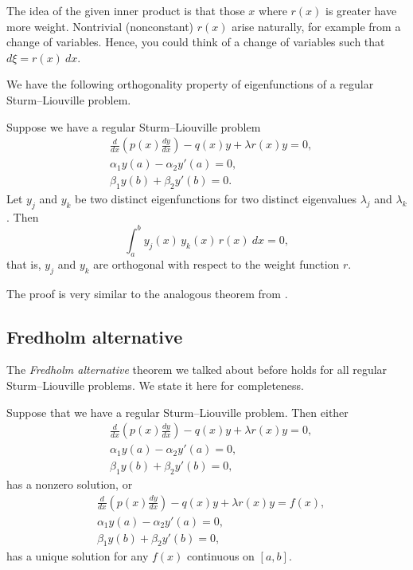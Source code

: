 The idea of the given inner product is that those $x$ where $r(x)$
is greater have more weight.
Nontrivial (nonconstant)
$r(x)$ arise naturally, for example from a change of variables.
Hence, you could
think of a change of variables such that $d\xi = r(x)~ dx$.

We have the following orthogonality property of eigenfunctions of a
regular Sturm--Liouville problem.

\begin{theorem}
Suppose we have a regular Sturm--Liouville problem
\begin{align*}
&\frac{d}{dx} \left( p(x) \frac{dy}{dx} \right)
- q(x) y + \lambda r(x) y = 0 , \\
&\alpha_1 y(a) - \alpha_2 y'(a) = 0 , \\
&\beta_1 y(b) + \beta_2 y'(b) = 0 .
\end{align*}
Let $y_j$ and $y_k$ be two distinct eigenfunctions for two
distinct eigenvalues $\lambda_j$ and $\lambda_k$.  Then
\begin{equation*}
\int_a^b y_j(x) \, y_k(x) \, r(x) ~dx = 0,
\end{equation*}
that is, $y_j$ and $y_k$ are orthogonal with respect to the weight function
$r$.
\end{theorem}

The proof is very similar to the analogous theorem from .

\subsection{Fredholm alternative}

The \emph{Fredholm alternative} theorem we talked about before
holds for all regular Sturm--Liouville problems.
We state it here for completeness.

\begin{theorem}%
Suppose that we have a regular Sturm--Liouville problem.
Then either
\begin{align*}
&\frac{d}{dx} \left( p(x) \frac{dy}{dx} \right)
- q(x) y + \lambda r(x) y = 0 , \\
&\alpha_1 y(a) - \alpha_2 y'(a) = 0 , \\
&\beta_1 y(b) + \beta_2 y'(b) = 0 ,
\end{align*}
has a nonzero solution, or
\begin{align*}
&\frac{d}{dx} \left( p(x) \frac{dy}{dx} \right)
- q(x) y + \lambda r(x) y = f(x) , \\
&\alpha_1 y(a) - \alpha_2 y'(a) = 0 , \\
&\beta_1 y(b) + \beta_2 y'(b) = 0 ,
\end{align*}
has a unique solution for any $f(x)$ continuous on $[a,b]$.
\end{theorem}

